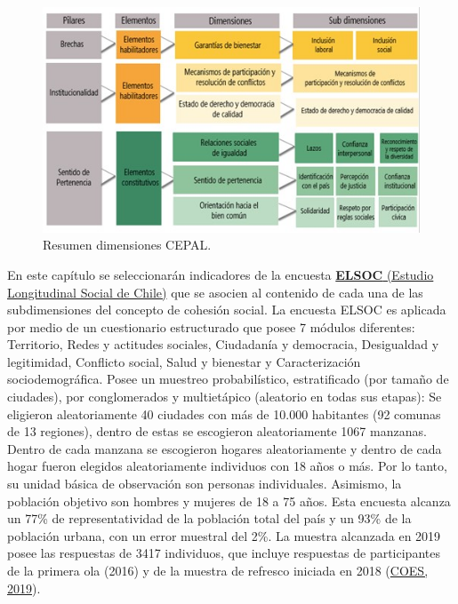 \documentclass[
  12pt,
]{book}
\begin{document}
\begin{figure}[H]

{\centering \includegraphics[width=1\linewidth,height=1\textheight]{images/dimensiones-cepal} 

}

\caption{Resumen dimensiones CEPAL.}\label{fig:esquema-cepal}
\end{figure}

En este capítulo se seleccionarán indicadores de la encuesta \href{https://coes.cl/encuesta-panel/}{\textbf{ELSOC} (Estudio Longitudinal Social de Chile)} que se asocien al contenido de cada una de las subdimensiones del concepto de cohesión social. La encuesta ELSOC es aplicada por medio de un cuestionario estructurado que posee 7 módulos diferentes: Territorio, Redes y actitudes sociales, Ciudadanía y democracia, Desigualdad y legitimidad, Conflicto social, Salud y bienestar y Caracterización sociodemográfica. Posee un muestreo probabilístico, estratificado (por tamaño de ciudades), por conglomerados y multietápico (aleatorio en todas sus etapas): Se eligieron aleatoriamente 40 ciudades con más de 10.000 habitantes (92 comunas de 13 regiones), dentro de estas se escogieron aleatoriamente 1067 manzanas. Dentro de cada manzana se escogieron hogares aleatoriamente y dentro de cada hogar fueron elegidos aleatoriamente individuos con 18 años o más. Por lo tanto, su unidad básica de observación son personas individuales. Asimismo, la población objetivo son hombres y mujeres de 18 a 75 años. Esta encuesta alcanza un 77\% de representatividad de la población total del país y un 93\% de la población urbana, con un error muestral del 2\%. La muestra alcanzada en 2019 posee las respuestas de 3417 individuos, que incluye respuestas de participantes de la primera ola (2016) y de la muestra de refresco iniciada en 2018 (\protect\hyperlink{ref-coes_Radiografia_2019}{COES, 2019}).
\end{document}
